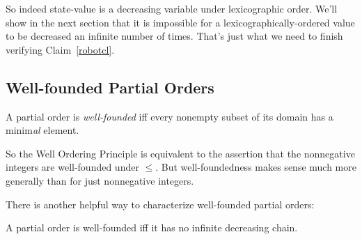 So indeed state-value is a decreasing variable under lexicographic order.
We'll show in the next section that it is impossible for a
lexicographically-ordered value to be decreased an infinite number of
times.  That's just what we need to finish verifying Claim~\ref{robotcl}.

\subsection{Well-founded Partial Orders}

\begin{definition}\label{wfpo}
  A partial order is \emph{well-founded} iff every nonempty subset of its
  domain has a minim\emph{al} element.
\end{definition}

\iffalse
That is, $m \in S$ is minimal if $m' \preceq m$ implies that $m' =
m$ for all $m' \in S$.\fi

So the Well Ordering Principle is equivalent to the assertion that the
nonnegative integers are well-founded under $\leq$.  But well-foundedness
makes sense much more generally than for just nonnegative integers.
\iffalse

For example, by Lemma~\ref{finmin}, every partially ordered finite set has
a minimal element, so all finite partial orders are automatically well
founded.  Note that in this case we can't expect to find a minim\emph{um}
element, since even in a finite partial order, there often isn't any
minimum.


\textbf{Quick Exercise:} Give an example of a partial order with a
\emph{unique} minim\emph{al} element but no minim\emph{um} element.

\hint It can't be a finite partial order.

\solution{The set of all real numbers totally ordered by $\leq$ has no
minimal element.  We can regard $\le$ as a partial order on $\reals \union
\set{i}$, where $i$ is the complex number $\sqrt{-1}$, by agreeing that $i$
is not comparable to every real number.  This makes $i$ the unique minimal
element -- it's also the unique maximal element -- but there is no minimum
element.}
\fi

There is another helpful way to characterize well-founded partial orders:
{\begin{lemma}\label{d-chain}
A partial order is well-founded iff it has no infinite decreasing chain.
\end{lemma}}

